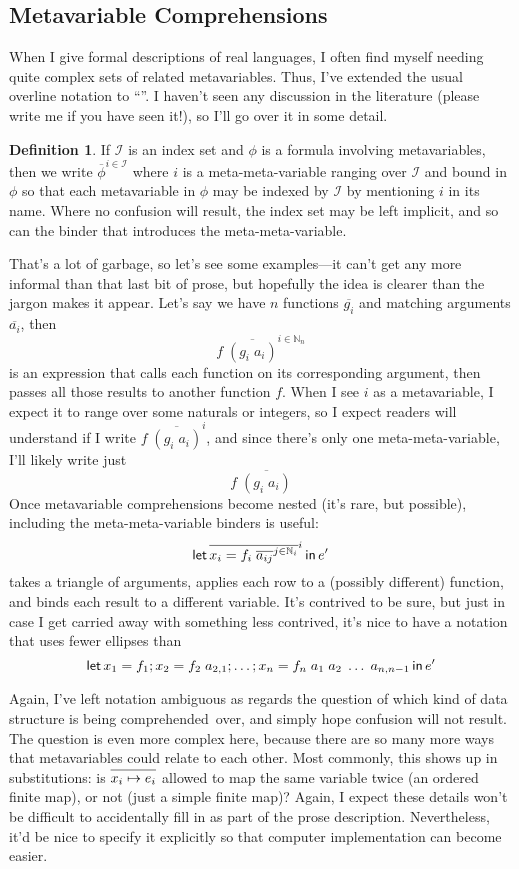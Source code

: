 \documentclass[11pt]{article} %
\theoremstyle{definition}
\newtheorem{definition}{Definition}
\theoremstyle{remark}
\begin{document}
\subsection{Metavariable Comprehensions}

When I give formal descriptions of real languages, I often find myself needing quite complex sets of related metavariables.
Thus, I've extended the usual overline notation to ``''.
I haven't seen any discussion in the literature (please write me if you have seen it!), so I'll go over it in some detail.

\begin{definition}
  If $\mathscr I$ is an index set and $\phi$ is a formula involving metavariables, then we write
    $\overline{\phi}^{i\in\mathscr I}$
  where $i$ is a meta-meta-variable ranging over $\mathscr I$ and bound in $\phi$ so that each metavariable in $\phi$ may be indexed by $\mathscr I$ by mentioning $i$ in its name.
  Where no confusion will result, the index set may be left implicit, and so can the binder that introduces the meta-meta-variable.
\end{definition}

That's a lot of garbage, so let's see some examples---it can't get any more informal than that last bit of prose, but hopefully the idea is clearer than the jargon makes it appear.
Let's say we have $n$ functions $\overline{g_i}$ and matching arguments $\overline{a_i}$, then
  $$f\;\overline{(g_i\;a_i)}^{i\in\mathbb N_n}$$
is an expression that calls each function on its corresponding argument, then passes all those results to another function $f$.
When I see $i$ as a metavariable, I expect it to range over some naturals or integers, so I expect readers will understand if I write $f\;\overline{(g_i\;a_i)}^{i}$, and since there's only one meta-meta-variable, I'll likely write just
  $$f\;\overline{(g_i\;a_i)}$$
Once metavariable comprehensions become nested (it's rare, but possible), including the meta-meta-variable binders is useful:
  $$\mathinner{\textsf{let}}{\overline{x_i = f_i\;\overline{a_{ij}}^{j \in \mathbb N_i}}^i}\mathinner{\textsf{in}} e'$$
takes a triangle of arguments, applies each row to a (possibly different) function, and binds each result to a different variable.
It's contrived to be sure, but just in case I get carried away with something less contrived, it's nice to have a notation that uses fewer ellipses than
  $$\mathinner{\textsf{let}}{x_1 = f_1; x_2 = f_2\;a_{2,1}; \ldots; x_n = f_n\;a_1\;a_2\;\ldots\;a_{n,n-1}}\mathinner{\textsf{in}} e'$$

Again, I've left notation ambiguous as regards the question of which kind of data structure is being comprehended~over, and simply hope confusion will not result.
The question is even more complex here, because there are so many more ways that metavariables could relate to each other.
Most commonly, this shows up in substitutions: is $\overline{\mathstrut x_i \mapsto e_i}$ allowed to map the same variable twice (an ordered finite map), or not (just a simple finite map)?
Again, I expect these details won't be difficult to accidentally fill in as part of the prose description.
Nevertheless, it'd be nice to specify it explicitly so that computer implementation can become easier.
\end{document}
